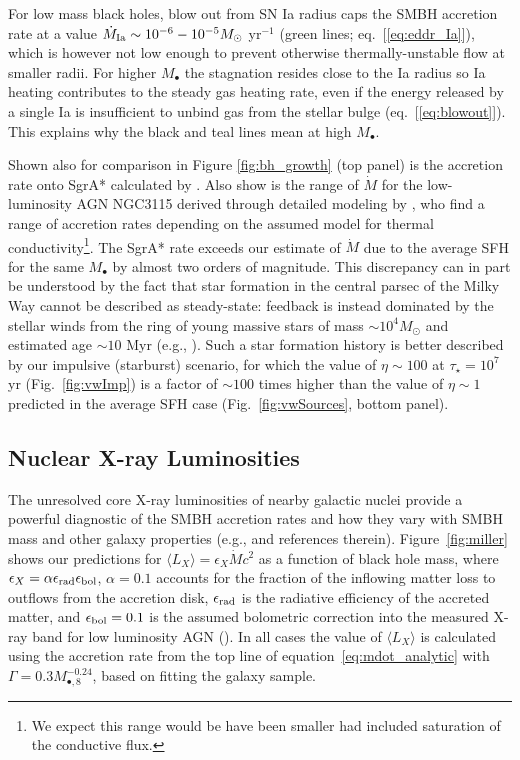 \documentclass[usenatbib,fleqn]{mn2e}
\newcommand{\Mbheight}{M_{\bullet,8}}
\begin{document}
For low mass black holes, blow out from SN Ia radius caps the SMBH
accretion rate at a value $\dot{M}_{\rm Ia} \sim
10^{-6}-10^{-5}M_{\odot}$ yr$^{-1}$ (green lines;
eq.~[\ref{eq:eddr_Ia}]), which is however not low enough to prevent
otherwise thermally-unstable flow at smaller radii.  For higher
$M_{\bullet}$ the stagnation resides close to the Ia radius so Ia
heating contributes to the steady gas heating rate, even if the energy
released by a single Ia is insufficient to unbind gas from the stellar
bulge (eq.~[\ref{eq:blowout}]).  This explains why the black and teal lines mean at high $M_{\bullet}$.

Shown also for comparison in Figure \ref{fig:bh_growth} (top panel) is
the accretion rate onto SgrA* calculated by \citet{Quataert:2004a}.
Also show is the range of $\dot{M}$ for the low-luminosity AGN NGC3115
derived through detailed modeling by \citet{ShcherbakovWong+:2014a},
who find a range of accretion rates depending on the assumed model for
thermal conductivity\footnote{We expect this range would be have been
  smaller had \citet{ShcherbakovWong+:2014a} included saturation of
  the conductive flux.}.  The SgrA* rate exceeds our estimate of
$\dot{M}$ due to the average SFH for the same $M_{\bullet}$ by almost
two orders of magnitude.  This discrepancy can in part be understood
by the fact that star formation in the central parsec of the Milky Way
cannot be described as steady-state: feedback is instead dominated by
the stellar winds from the ring of young massive stars of mass $\sim
10^{4}M_{\odot}$ and estimated age $\sim 10$ Myr (e.g.,
\citealt{Schodel+07}).  Such a star formation history is better
described by our impulsive (starburst) scenario, for which the value
of $\eta \sim 100$ at $\tau_{\star} = 10^{7}$ yr
(Fig.~\ref{fig:vwImp}) is a factor of $\sim 100$ times higher than the
value of $\eta \sim 1$ predicted in the average SFH case
(Fig.~\ref{fig:vwSources}, bottom panel).


\subsection{Nuclear X-ray Luminosities}
\label{sec:Lx}

The unresolved core X-ray luminosities of nearby galactic nuclei
provide a powerful diagnostic of the SMBH accretion rates and how they
vary with SMBH mass and other galaxy properties (e.g., \citealt{Ho08}
and references therein).  Figure~\ref{fig:miller} shows our
predictions for $\langle L_{X} \rangle =\epsilon_X \dot{M} c^2$ as a
function of black hole mass, where $\epsilon_{X} = \alpha\epsilon_{\rm
  rad}\epsilon_{\rm bol}$, $\alpha = 0.1$ accounts for the fraction of
the inflowing matter loss to outflows from the accretion disk,
$\epsilon_{\rm rad}$ is the radiative efficiency of the accreted
matter, and $\epsilon_{\rm bol} = 0.1$ is the assumed bolometric
correction into the measured X-ray band for low luminosity AGN
(\citealt{Ho08}).  In all cases the value of $\langle L_X \rangle$ is
calculated using the accretion rate from the top line of
equation~\eqref{eq:mdot_analytic} with $\Gamma = 0.3
\Mbheight^{-0.24}$, based on fitting the \citet{LauerFaber+:2007a}
galaxy sample. 
\end{document}
